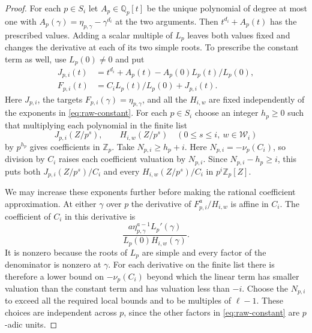 \begin{proof}
    For each $p \in S_i$ let $A_p \in \mathbb{Q}_p[t]$ be the unique polynomial of degree at most one with $A_p(\gamma) = \eta_{p, \gamma} - \gamma^{d_i}$ at the two arguments.
    Then $t^{d_i} + A_p(t)$ has the prescribed values.
    Adding a scalar multiple of $L_p$ leaves both values fixed and changes the derivative at each of its two simple roots.
    To prescribe the constant term as well, use $L_p(0) \ne 0$ and put
    \begin{align*}
        J_{p, i}(t) &= t^{d_i} + A_p(t) - A_p(0)L_p(t)/L_p(0), \\
        F_{p, i}(t) &= C_i L_p(t)/L_p(0) + J_{p, i}(t).
    \end{align*}
    Here $J_{p, i}$, the targets $F_{p, i}(\gamma) = \eta_{p, \gamma}$, and all the $H_{i, w}$ are fixed independently of the exponents in \eqref{eq:raw-constant}.
    For each $p \in S_i$ choose an integer $h_p \ge 0$ such that multiplying each polynomial in the finite list
    \[
        J_{p, i}(Z/p^s), \qquad H_{i, w}(Z/p^s)
        \quad (0 \le s \le i,\ w \in \mathcal{W}_i)
    \]
    by $p^{h_p}$ gives coefficients in $\mathbb{Z}_p$.
    Take $N_{p, i} \ge h_p + i$.
    Here $N_{p, i} = -\nu_p(C_i)$, so division by $C_i$ raises each coefficient valuation by $N_{p, i}$.
    Since $N_{p, i} - h_p \ge i$, this puts both $J_{p, i}(Z/p^s)/C_i$ and every $H_{i, w}(Z/p^s)/C_i$ in $p^i\mathbb{Z}_p[Z]$.

    We may increase these exponents further before making the rational coefficient approximation.
    At either $\gamma$ over $p$ the derivative of $F_{p, i}^{a}/H_{i, w}$ is affine in $C_i$.
    The coefficient of $C_i$ in this derivative is
    \[
        \frac{a \eta_{p, \gamma}^{a - 1} L_p'(\gamma)}
             {L_p(0) H_{i, w}(\gamma)}.
    \]
    It is nonzero because the roots of $L_p$ are simple and every factor of the denominator is nonzero at $\gamma$.
    For each derivative on the finite list there is therefore a lower bound on $-\nu_p(C_i)$ beyond which the linear term has smaller valuation than the constant term and has valuation less than $-i$.
    Choose the $N_{p, i}$ to exceed all the required local bounds and to be multiples of $\ell - 1$.
    These choices are independent across $p$, since the other factors in \eqref{eq:raw-constant} are $p$-adic units.


\end{proof}
